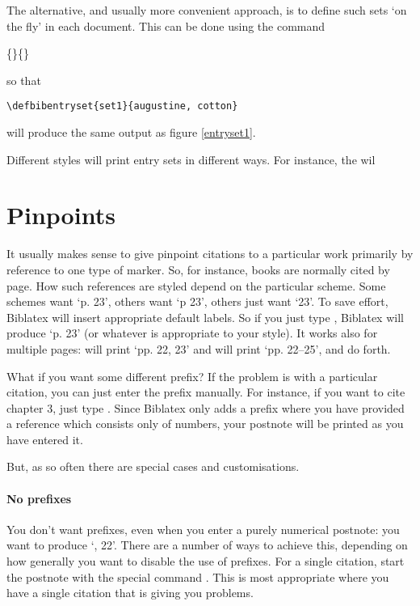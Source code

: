 The alternative, and usually more convenient approach, is to define
such sets `on the fly' in each document. This can be done using the
command
\begin{pseudoverb}
  \centering{}\{\}\{\}
\end{pseudoverb}
so that
\begin{Verbatim}
\defbibentryset{set1}{augustine, cotton}
\end{Verbatim}
will produce the same output as figure \ref{entryset1}.

Different styles will print entry sets in different ways. For
instance, the  wil

\section{Pinpoints}

It usually makes sense to give pinpoint citations to a particular work
primarily by reference to one type of marker. So, for instance, books
are normally cited by page. How such references are styled depend on
the particular scheme. Some schemes want `p. 23', others want `p 23',
others just want `23'. To save effort, Biblatex will insert
appropriate default labels. So if you just type ,
Biblatex will produce `p. 23' (or whatever is appropriate to your
style). It works also for multiple pages: 
will print `pp. 22, 23' and  will print
`pp. 22--25', and do forth.


What if you want some different prefix? If the problem is with a
particular citation, you can just enter the prefix manually. For
instance, if you want to cite chapter 3, just type
. Since Biblatex only adds a
prefix where you have provided a reference which consists only of
numbers, your postnote will be printed as you have entered it.



 But, as so often there are special
cases and customisations.


\paragraph{No prefixes} You don't want prefixes, even when you enter a
purely numerical postnote: you want  to produce
`, 22'. There are a number of ways to achieve this,
depending on how generally you want to disable the use of prefixes.
For a single citation, start the postnote with the special command
.   This is most appropriate where you have a
single citation that is giving you problems.

